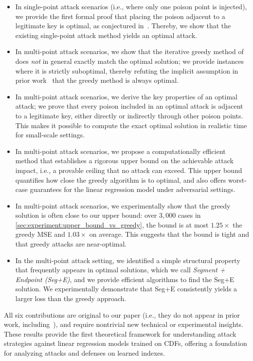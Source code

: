 \documentclass[acmsmall]{acmart}
\begin{document}
\begin{itemize}[leftmargin=1.5em]
\item In single-point attack scenarios (i.e., where only one poison point is injected), we provide the first formal proof that placing the poison adjacent to a legitimate key is optimal, as conjectured in~\cite{kornaropoulos2022price}. Thereby, we show that the existing single-point attack method yields an optimal attack.
\item In multi-point attack scenarios, we show that the iterative greedy method of~\cite{kornaropoulos2022price} does \emph{not} in general exactly match the optimal solution;
we provide instances where it is strictly suboptimal, thereby refuting the implicit assumption in prior work~\cite{kornaropoulos2022price} that the greedy method is always optimal.
\item In multi-point attack scenarios, we derive the key properties of an optimal attack; we prove that every poison included in an optimal attack is adjacent to a legitimate key, either directly or indirectly through other poison points. This makes it possible to compute the exact optimal solution in realistic time for small-scale settings.
\item In multi-point attack scenarios, we propose a computationally efficient method that establishes a rigorous upper bound on the achievable attack impact, i.e., a provable ceiling that no attack can exceed. This upper bound quantifies how close the greedy algorithm is to optimal, and also offers worst-case guarantees for the linear regression model under adversarial settings.
\item In multi-point attack scenarios, we experimentally show that the greedy solution is often close to our upper bound:
over $3{,}000$ cases in \cref{sec:experiment:upper_bound_vs_greedy}, the bound is at most $1.25\times$ the greedy MSE and $1.03\times$ on average.
This suggests that the bound is tight and that greedy attacks are near-optimal.
\item In the multi-point attack setting, we identified a simple structural property that frequently appears in optimal solutions, which we call \textit{Segment + Endpoint (Seg+E)}, and we provide efficient algorithms to find the Seg+E solution. We experimentally demonstrate that Seg+E consistently yields a larger loss than the greedy approach.
\end{itemize}
All six contributions are original to our paper (i.e., they do not appear in prior work, including~\cite{kornaropoulos2022price}), and require nontrivial new technical or experimental insights.
These results provide the first theoretical framework for understanding attack strategies against linear regression models trained on CDFs, offering a foundation for analyzing attacks and defenses on learned indexes.
\end{document}
